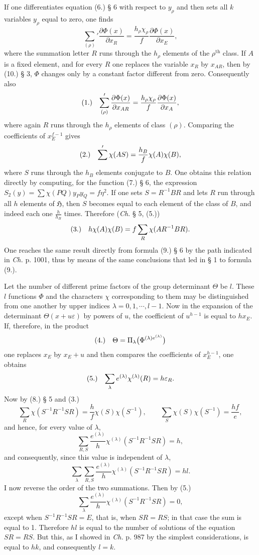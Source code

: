 \documentclass[11pt]{article}
\makeatletter
\newcommand{\Hgrp}{\mathfrak{H}}
\newcommand{\frobtagc}[2]{\[\begin{array}{@{}r@{\quad}c@{}}\textup{(#1)} & \displaystyle #2\end{array}\]}
\makeatother
\begin{document}
If one differentiates equation (6.) § 6 with respect to $y_\rho$ and then sets all $k$ variables $y_\rho$ equal to zero, one finds
\[
\sum_{(\rho)}'\frac{\partial\Phi(x)}{\partial x_R}=\frac{h_\rho\chi_\rho}{f}\frac{\partial\Phi(x)}{\partial x_E},
\]
where the summation letter $R$ runs through the $h_\rho$ elements of the $\rho^{\mathrm{th}}$ class. If $A$ is a fixed element, and for every $R$ one replaces the variable $x_R$ by $x_{AR}$, then by (10.) § 3, $\Phi$ changes only by a constant factor different from zero. Consequently also
\frobtagc{1.}{\sum_{(\rho)}'\frac{\partial\Phi(x)}{\partial x_{AR}}=\frac{h_\rho\chi_\rho}{f}\frac{\partial\Phi(x)}{\partial x_A},}
where again $R$ runs through the $h_\rho$ elements of class $(\rho)$. Comparing the coefficients of $x_E^{f-1}$ gives
\frobtagc{2.}{\sum'\chi(AS)=\frac{h_B}{f}\chi(A)\chi(B),}
where $S$ runs through the $h_B$ elements conjugate to $B$. One obtains this relation directly by computing, for the function (7.) § 6, the expression $S_2(y)=\sum\chi(PQ)y_Py_Q=f\eta^2$. If one sets $S=R^{-1}BR$ and lets $R$ run through all $h$ elements of $\Hgrp$, then $S$ becomes equal to each element of the class of $B$, and indeed each one $\frac{h}{h_B}$ times. Therefore (\emph{Ch.} § 5, (5.))
\frobtagc{3.}{h\chi(A)\chi(B)=f\sum_R\chi(AR^{-1}BR).}
One reaches the same result directly from formula (9.) § 6 by the path indicated in \emph{Ch.} p. 1001, thus by means of the same conclusions that led in § 1 to formula (9.).

Let the number of different prime factors of the group determinant $\Theta$ be $l$. These $l$ functions $\Phi$ and the characters $\chi$ corresponding to them may be distinguished from one another by upper indices $\lambda=0,1,\cdots,l-1$. Now in the expansion of the determinant $\Theta(x+u\varepsilon)$ by powers of $u$, the coefficient of $u^{h-1}$ is equal to $hx_E$. If, therefore, in the product
\frobtagc{4.}{\Theta=\Pi_\lambda\bigl(\Phi^{(\lambda)e^{(\lambda)}}\bigr)}
one replaces $x_E$ by $x_E+u$ and then compares the coefficients of $x_E^{h-1}$, one obtains
\frobtagc{5.}{\sum_\lambda e^{(\lambda)}\chi^{(\lambda)}(R)=h\varepsilon_R.}
Now by (8.) § 5 and (3.)
\[
\sum_R\chi(S^{-1}R^{-1}SR)=\frac{h}{f}\chi(S)\chi(S^{-1}),\qquad \sum_S\chi(S)\chi(S^{-1})=\frac{hf}{e},
\]
and hence, for every value of $\lambda$,
\[
\sum_{R,S}\frac{e^{(\lambda)}}{h}\chi^{(\lambda)}(S^{-1}R^{-1}SR)=h,
\]
and consequently, since this value is independent of $\lambda$,
\[
\sum_\lambda\sum_{R,S}\frac{e^{(\lambda)}}{h}\chi^{(\lambda)}(S^{-1}R^{-1}SR)=hl.
\]
I now reverse the order of the two summations. Then by (5.)
\[
\sum_\lambda\frac{e^{(\lambda)}}{h}\chi^{(\lambda)}(S^{-1}R^{-1}SR)=0,
\]
except when $S^{-1}R^{-1}SR=E$, that is, when $SR=RS$; in that case the sum is equal to 1. Therefore $hl$ is equal to the number of solutions of the equation $SR=RS$. But this, as I showed in \emph{Ch.} p. 987 by the simplest considerations, is equal to $hk$, and consequently $l=k$.
\end{document}
